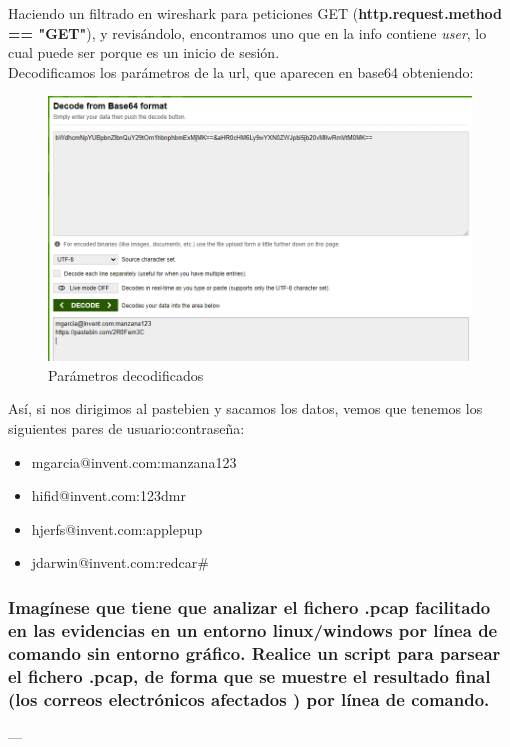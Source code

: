 \documentclass[12pt,twoside]{article}
\begin{document}
Haciendo un filtrado en wireshark para peticiones GET (\textbf{http.request.method == "GET"}), y revisándolo, encontramos uno que en la info contiene \textit{user}, lo cual puede ser porque es un inicio de sesión.\\
Decodificamos los parámetros de la url, que aparecen en base64 obteniendo:
\begin{figure}
    \centering
    \includegraphics[scale=0.4]{./imagenes/decode}
    \caption{Parámetros decodificados}
\end{figure}
Así, si nos dirigimos al pastebien y sacamos los datos, vemos que tenemos los siguientes pares de usuario:contraseña:
\begin{itemize}
    \item mgarcia@invent.com:manzana123
    \item hifid@invent.com:123dmr
    \item hjerfs@invent.com:applepup
    \item jdarwin@invent.com:redcar\#
\end{itemize}

\subsubsection*{Imagínese que tiene que analizar el fichero .pcap facilitado en las evidencias en un entorno linux/windows por línea de comando sin entorno gráfico. 
Realice un script para parsear el fichero .pcap, de forma que se muestre el resultado final (los correos electrónicos afectados ) por línea de comando.}

---

\end{document}
